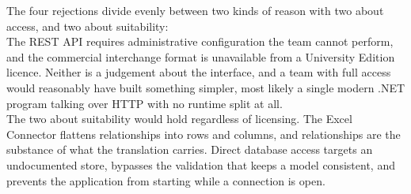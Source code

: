 The four rejections divide evenly between two kinds of reason with two about access, and two about suitability:\\

The REST API requires administrative configuration the team
cannot perform, and the commercial interchange format is unavailable from a
University Edition licence. Neither is a judgement about the interface, and a
team with full access would reasonably have built something simpler, most likely
a single modern .NET program talking over HTTP with no runtime split at all.\\

The two about suitability would hold regardless of licensing. The Excel
Connector flattens relationships into rows and columns, and relationships are the
substance of what the translation carries. Direct database access targets an
undocumented store, bypasses the validation that keeps a model consistent, and
prevents the application from starting while a connection is open.\\
